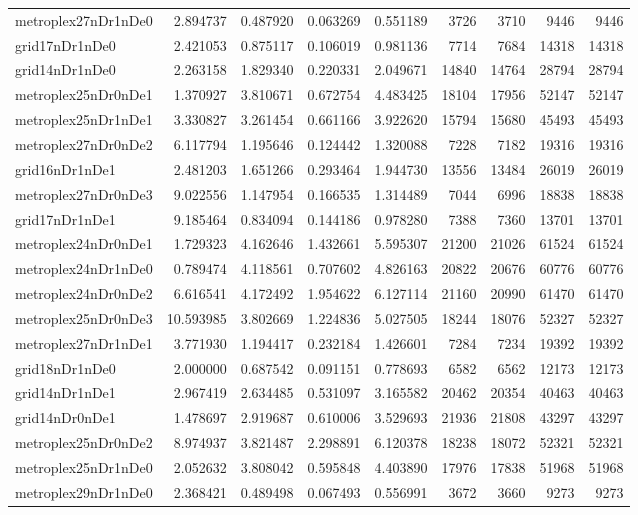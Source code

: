 \begin{longtable}{|l|r|r|r|r|r|r|r|r|}
metroplex27nDr1nDe0 & 2.894737 & 0.487920 & 0.063269 & 0.551189 & 3726 & 3710 & 9446 & 9446 \\
grid17nDr1nDe0 & 2.421053 & 0.875117 & 0.106019 & 0.981136 & 7714 & 7684 & 14318 & 14318 \\
grid14nDr1nDe0 & 2.263158 & 1.829340 & 0.220331 & 2.049671 & 14840 & 14764 & 28794 & 28794 \\
metroplex25nDr0nDe1 & 1.370927 & 3.810671 & 0.672754 & 4.483425 & 18104 & 17956 & 52147 & 52147 \\
metroplex25nDr1nDe1 & 3.330827 & 3.261454 & 0.661166 & 3.922620 & 15794 & 15680 & 45493 & 45493 \\
metroplex27nDr0nDe2 & 6.117794 & 1.195646 & 0.124442 & 1.320088 & 7228 & 7182 & 19316 & 19316 \\
grid16nDr1nDe1 & 2.481203 & 1.651266 & 0.293464 & 1.944730 & 13556 & 13484 & 26019 & 26019 \\
metroplex27nDr0nDe3 & 9.022556 & 1.147954 & 0.166535 & 1.314489 & 7044 & 6996 & 18838 & 18838 \\
grid17nDr1nDe1 & 9.185464 & 0.834094 & 0.144186 & 0.978280 & 7388 & 7360 & 13701 & 13701 \\
metroplex24nDr0nDe1 & 1.729323 & 4.162646 & 1.432661 & 5.595307 & 21200 & 21026 & 61524 & 61524 \\
metroplex24nDr1nDe0 & 0.789474 & 4.118561 & 0.707602 & 4.826163 & 20822 & 20676 & 60776 & 60776 \\
metroplex24nDr0nDe2 & 6.616541 & 4.172492 & 1.954622 & 6.127114 & 21160 & 20990 & 61470 & 61470 \\
metroplex25nDr0nDe3 & 10.593985 & 3.802669 & 1.224836 & 5.027505 & 18244 & 18076 & 52327 & 52327 \\
metroplex27nDr1nDe1 & 3.771930 & 1.194417 & 0.232184 & 1.426601 & 7284 & 7234 & 19392 & 19392 \\
grid18nDr1nDe0 & 2.000000 & 0.687542 & 0.091151 & 0.778693 & 6582 & 6562 & 12173 & 12173 \\
grid14nDr1nDe1 & 2.967419 & 2.634485 & 0.531097 & 3.165582 & 20462 & 20354 & 40463 & 40463 \\
grid14nDr0nDe1 & 1.478697 & 2.919687 & 0.610006 & 3.529693 & 21936 & 21808 & 43297 & 43297 \\
metroplex25nDr0nDe2 & 8.974937 & 3.821487 & 2.298891 & 6.120378 & 18238 & 18072 & 52321 & 52321 \\
metroplex25nDr1nDe0 & 2.052632 & 3.808042 & 0.595848 & 4.403890 & 17976 & 17838 & 51968 & 51968 \\
metroplex29nDr1nDe0 & 2.368421 & 0.489498 & 0.067493 & 0.556991 & 3672 & 3660 & 9273 & 9273 \\

\end{longtable}
